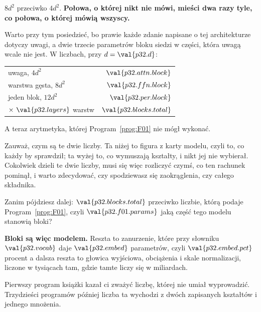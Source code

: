 \begin{fr}

$8d^{2}$ przeciwko $4d^{2}$. \textbf{Połowa, o której nikt nie mówi, mieści
dwa razy tyle, co połowa, o której mówią wszyscy.}

Warto przy tym posiedzieć, bo prawie każde zdanie napisane o tej
architekturze dotyczy uwagi, a dwie trzecie parametrów bloku siedzi w części,
która uwagą wcale nie jest. W liczbach, przy $d = \val{p32.d}$:

\begin{center}
\begin{tabular}{lr}
\toprule
uwaga, $4d^{2}$ & $\val{p32.attn.block}$ \\
warstwa gęsta, $8d^{2}$ & $\val{p32.ffn.block}$ \\
\midrule
jeden blok, $12d^{2}$ & $\val{p32.per.block}$ \\
$\times\ \val{p32.layers}$ warstw & $\val{p32.blocks.total}$ \\
\bottomrule
\end{tabular}
\end{center}

A teraz arytmetyka, której Program~\ref{prog:F01} nie mógł wykonać.

Zauważ, czym są te dwie liczby. Ta niżej to figura z karty modelu, czyli to,
co każdy by sprawdził; ta wyżej to, co wymuszają kształty, i nikt jej nie
wybierał. Cokolwiek dzieli te dwie liczby, musi się więc rozliczyć czymś, co
ten rachunek pominął, i warto zdecydować, czy spodziewasz się zaokrąglenia,
czy całego składnika.

Zanim pójdziesz dalej: $\val{p32.blocks.total}$ przeciwko liczbie, którą
podaje Program~\ref{prog:F01}, czyli $\val{p32.f01.params}$ \dash{} jaką
część tego modelu stanowią bloki?
\dotline
\nextframe
\end{fr}

\begin{fr}

\textbf{Bloki są więc modelem.} Reszta to zanurzenie, które przy słowniku
$\val{p32.vocab}$ daje $\val{p32.embed}$ parametrów, czyli
$\val{p32.embed.pct}$ procent \dash{} a dalsza reszta to głowica wyjściowa,
obciążenia i skale normalizacji, liczone w tysiącach tam, gdzie tamte liczy
się w miliardach.

Pierwszy program książki kazał ci zważyć liczbę, której nie umiał wyprowadzić.
Trzydzieści programów później liczba ta wychodzi z dwóch zapisanych kształtów
i jednego mnożenia.
\end{fr}

